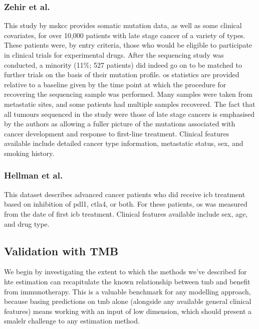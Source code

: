 \documentclass[../thesis.tex]{subfiles}
\begin{document}
\subsubsection*{Zehir et al.}
This study by \gls{mskcc} provides somatic mutation data, as well as some clinical covariates, for over 10,000 patients with late stage cancer of a variety of types. These patients were, by entry criteria, those who would be eligible to participate in clinical trials for experimental drugs. After the sequencing study was conducted, a minority (11\%; 527 patients) did indeed go on to be matched to further trials on the basis of their mutation profile. \gls{os} statistics are provided relative to a baseline given by the time point at which the procedure for recovering the sequencing sample was performed. Many samples were taken from metastatic sites, and some patients had multiple samples recovered. The fact that all tumours sequenced in the study were those of late stage cancers is emphasised by the authors as allowing a fuller picture of the mutations associated with cancer development and response to first-line treatment. Clinical features available include detailed cancer type information, metastatic status, sex, and smoking history.

\subsubsection*{Hellman et al.}
This dataset describes advanced cancer patients who did receive \gls{icb} treatment based on inhibition of \gls{pdl1}, \gls{ctla4}, or both. For these patients, \gls{os} was measured from the date of first \gls{icb} treatment. Clinical features available include sex, age, and drug type.

\subsection{Validation with TMB}
We begin by investigating the extent to which the methods we've described for \gls{hte} estimation can recapitulate the known relationship between \gls{tmb} and benefit from immunotherapy. This is a valuable benchmark for any modelling approach, because basing predictions on \gls{tmb} alone (alongside any available general clinical features) means working with an input of low dimension, which should present a smalelr challenge to any estimation method.
\end{document}
